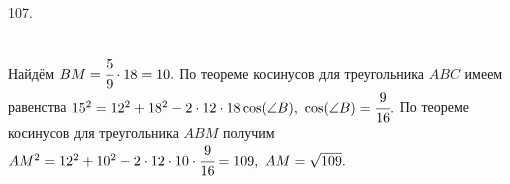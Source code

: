 107. \begin{figure}[ht!]
\end{figure}\\
Найдём $BM=\cfrac{5}{9}\cdot18=10.$ По теореме косинусов для треугольника $ABC$ имеем равенства $15^2=12^2+18^2-2\cdot12\cdot18\cos(\angle B),\ \cos(\angle B)=\cfrac{9}{16}.$ По теореме косинусов для треугольника $ABM$ получим $AM^2=12^2+10^2-2\cdot12\cdot10\cdot\cfrac{9}{16}=109,\ AM=\sqrt{109}.$\\
